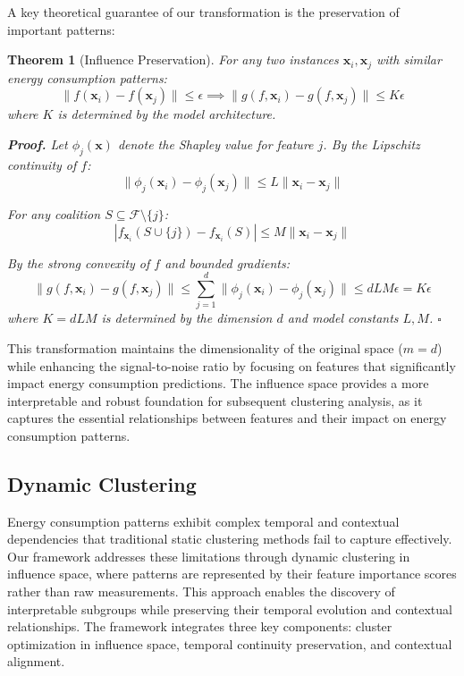 \documentclass[final,5p,times,twocolumn,numbers]{elsarticle}
\newtheorem{theorem}[definition]{Theorem}
\newenvironment{proof}[1][Proof]{\textbf{#1.} }{\hfill$\square$\par\vspace{1ex}}
\begin{document}
A key theoretical guarantee of our transformation is the preservation of important patterns:
\begin{theorem}[Influence Preservation]
For any two instances $\mathbf{x}_i, \mathbf{x}_j$ with similar energy consumption patterns:
\begin{equation}
    \|f(\mathbf{x}_i) - f(\mathbf{x}_j)\| \leq \epsilon \implies \|g(f,\mathbf{x}_i) - g(f,\mathbf{x}_j)\| \leq K\epsilon
\end{equation}
where $K$ is determined by the model architecture.

\begin{proof}
Let $\phi_j(\mathbf{x})$ denote the Shapley value for feature $j$. By the Lipschitz continuity of $f$:
\begin{equation}
    \|\phi_j(\mathbf{x}_i) - \phi_j(\mathbf{x}_j)\| \leq L\|\mathbf{x}_i - \mathbf{x}_j\|
\end{equation}

For any coalition $S \subseteq \mathcal{F}\setminus\{j\}$:
\begin{equation}
    |f_{\mathbf{x}_i}(S \cup \{j\}) - f_{\mathbf{x}_i}(S)| \leq M\|\mathbf{x}_i - \mathbf{x}_j\|
\end{equation}

By the strong convexity of $f$ and bounded gradients:
\begin{equation}
    \|g(f,\mathbf{x}_i) - g(f,\mathbf{x}_j)\| \leq \sum_{j=1}^d \|\phi_j(\mathbf{x}_i) - \phi_j(\mathbf{x}_j)\| \leq dLM\epsilon = K\epsilon
\end{equation}
where $K = dLM$ is determined by the dimension $d$ and model constants $L,M$.
\end{proof}
\end{theorem}
This transformation maintains the dimensionality of the original space ($m=d$) while enhancing the signal-to-noise ratio by focusing on features that significantly impact energy consumption predictions. The influence space provides a more interpretable and robust foundation for subsequent clustering analysis, as it captures the essential relationships between features and their impact on energy consumption patterns.
\subsection{Dynamic Clustering}
Energy consumption patterns exhibit complex temporal and contextual dependencies that traditional static clustering methods fail to capture effectively. Our framework addresses these limitations through dynamic clustering in influence space, where patterns are represented by their feature importance scores rather than raw measurements. This approach enables the discovery of interpretable subgroups while preserving their temporal evolution and contextual relationships. The framework integrates three key components: cluster optimization in influence space, temporal continuity preservation, and contextual alignment.
\end{document}
